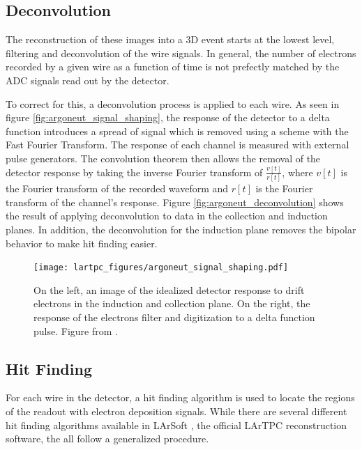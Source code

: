 \subsection{Deconvolution}
The reconstruction of these images into a 3D event starts at the lowest level, filtering and deconvolution of the wire signals.  In general, the number of electrons recorded by a given wire as a function of time is not prefectly matched by the ADC signals read out by the detector.

To correct for this, a deconvolution process is applied to each wire.  As seen in figure \ref{fig:argoneut_signal_shaping}, the response of the detector to a delta function introduces a spread of signal which is removed using a scheme with the Fast Fourier Transform. The response of each channel is measured with external pulse generators.  The convolution theorem then allows the removal of the detector response by taking the  inverse Fourier transform of $\frac{v[t]}{r[t]}$, where $v[t]$ is the Fourier transform of the recorded waveform and $r[t]$ is the Fourier transform of the channel's response.  Figure \ref{fig:argoneut_deconvolution} shows the result of applying deconvolution to \argoneut data in the collection and induction planes.  In addition, the deconvolution for the induction plane removes the bipolar behavior to make hit finding easier.


\begin{figure}[h]
  \centering
  \texttt{[image: lartpc\_figures/argoneut\_signal\_shaping.pdf]}
  \caption[Signal Shaping in \argoneut]{On the left, an image of the idealized detector response to drift electrons in the induction and collection plane.  On the right, the response of the electrons filter and digitization to a delta function pulse.  Figure from \cite{Anderson:2012vc}.}
  \label{fig:signal_shaping}
\end{figure}

\subsection{Hit Finding}

For each wire in the detector, a hit finding algorithm is used to locate the regions of the readout with electron deposition signals.  While there are several different hit finding algorithms available in LArSoft \cite{Church:2013hea}, the official LArTPC reconstruction software, the all follow a generalized procedure.

